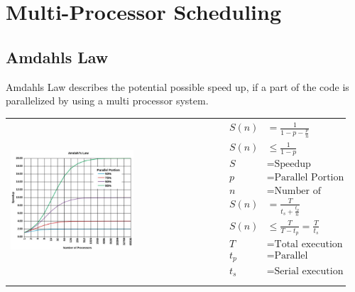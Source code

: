 \section{Multi-Processor Scheduling }
	\subsection{Amdahls Law}
		Amdahls Law	describes the potential possible speed up, if a part of the code is parallelized by using a multi processor system.
		\begin{longtable}{p{0.6\linewidth}p{0.35\linewidth}}
			\vspace{0pt}
			
			\includegraphics[width=0.6\textwidth]{./pictures/amdahl.png}
			&
			\begin{equation*}
				\begin{aligned}
					S(n) &= \frac{1}{1-p-\frac{p}{n}} \\
					S(n) &\leq  \frac{1}{1-p} \\
					S &= \text{Speedup} \\
					p &= \text{Parallel Portion} \\
					n &= \text{Number of Processors} \\
					S(n) &= \frac{T}{t_s+\frac{t_p}{n}} \\
					S(n) &\leq  \frac{T}{T-t_p}=\frac{T}{t_s} \\
					T &= \text{Total execution time} \\
					t_p &= \text{Parallel execution time} \\
					t_s &= \text{Serial execution time} \\
				\end{aligned}
			\end{equation*}
		\end{longtable}

